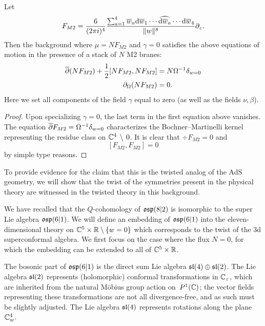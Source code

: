 \begin{lem}
Let
\[
 F_{M2} = \frac{6}{(2\pi i)^4} \frac{\sum_{a=1}^4 \overline{w}_a {\rm d} \overline{w}_1 \cdots \widehat{{\rm d} \overline{w}_a} \cdots {\rm d} \overline{w}_4}{\|w\|^{8}} \partial_z .
\]
Then the background where $\mu = N F_{M2}$ and $\gamma = 0$
satisfies the above equations of motion in the presence of a stack of $N$ M2 branes:
\begin{align*}
\overline{\partial} (N F_{M2}) + \frac12 [N F_{M2}, N F_{M2}] & = N \Omega^{-1} \delta_{w=0} \\
\partial_{\Omega} (N F_{M2}) & = 0  .
\end{align*}
Here we set all components of the field $\gamma$ equal to zero (as well as the fields $\nu,\beta$). 
\end{lem}

\begin{proof}
Upon specializing $\gamma = 0$, the last term in the first equation above vanishes. The equation $\overline{\partial} F_{M2} = \Omega^{-1} \delta_{w=0}$ characterizes the Bochner--Martinelli kernel representing the residue class on $\mathbb C^4 \, \setminus \, 0$. 
It is clear that $\div F_{M2} = 0$ and 
\[
[F_{M2}, F_{M2}] = 0
\] 
by simple type reasons. 
\end{proof}

\parsec[]

To provide evidence for the claim that this is the twisted analog of the AdS geometry, we will show that the twist of the symmetries present in the physical theory are witnessed in the twisted theory in this background. 

We have recalled that the $Q$-cohomology of $\mathfrak{osp}(8|2)$ is isomorphic to the super Lie algebra $\mathfrak{osp}(6|1)$. 
We will define an embedding of $\mathfrak{osp}(6|1)$ into the eleven-dimensional theory on $\mathbb C^5 \times \mathbb R \setminus \{w=0\}$ which corresponds to the twist of the 3d superconformal algebra.
We first focus on the case where the flux $N=0$, for which the embedding can be extended to all of $\mathbb C^5 \times \mathbb R$. 

\parsec[] 

The bosonic part of $\mathfrak{osp}(6|1)$ is the direct sum Lie algebra $\mathfrak{sl}(4) \oplus \mathfrak{sl}(2)$. 
The Lie algebra $\mathfrak{sl}(2)$ represents (holomorphic) conformal transformations in $\mathbb C_z$, which are inherited from the natural M\"obius group action on~$P^1(\mathbb{C})$; the vector fields representing these transformations are not all divergence-free, and as such must be slightly adjusted. 
The Lie algebra $\mathfrak{sl}(4)$ represents rotations along the plane $\mathbb C^4_w$.   

